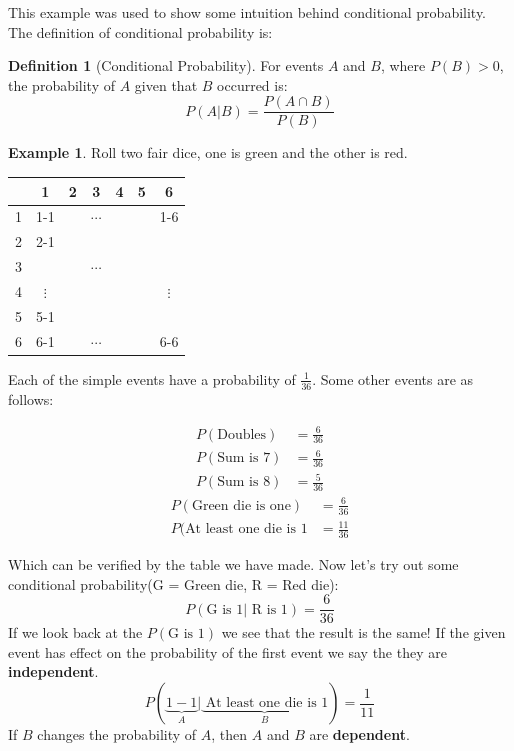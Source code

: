 \documentclass{article}
\theoremstyle{plain}
\theoremstyle{definition}
\newtheorem{defn}{Definition}[section]
\newtheorem{example}{Example}[section]
\theoremstyle{remark}
\begin{document}
This example was used to show some intuition behind conditional probability. The definition of conditional probability is:
\begin{defn}[Conditional Probability]
For events $A$ and $B$, where $P(B) > 0$, the probability of $A$ given that $B$ occurred is:
$$
P(A|B) = \frac{P(A \cap B)}{P(B)}
$$
\end{defn}

\begin{example}
  Roll two fair dice, one is green and the other is red.\\
  \begin{center}
    \begin{tabular}{r|c c c c c c}
      & 1 & 2 & 3 & 4 & 5 & 6\\  
      \hline
      1 & 1-1 & & $\cdots$ & & & 1-6\\
      2 & 2-1 & & &  & \\
      3 &  & & $\cdots$& & \\
      4 & $\vdots$ & & & & & $\vdots$ \\
      5 & 5-1 & & & & & \\
      6 & 6-1 & & $\cdots$ & & & 6-6
    \end{tabular}
  \end{center}
Each of the simple events have a probability of $\frac{1}{36}$. Some other events are as follows:
\begin{multicols}{2}
  \begin{align*}
    P(\text{Doubles}) &= \frac{6}{36}\\
    P(\text{Sum is 7}) &= \frac{6}{36}\\
    P(\text{Sum is 8}) &= \frac{5}{36}
  \end{align*}
  \vfill
  \columnbreak
  \begin{align*}
    P(\text{Green die is one}) &= \frac{6}{36}\\[7pt]
    P(\text{At least one die is 1} &= \frac{11}{36}
  \end{align*}
\end{multicols}
Which can be verified by the table we have made. Now let's try out some conditional probability(G = Green die, R = Red die):
$$
P(\text{G is 1}|\text{ R is 1}) = \frac{6}{36}
$$
If we look back at the $P(\text{G is 1})$ we see that the result is the same! If the given event has effect on the probability of the first event we say the they are \textbf{independent}.
$$
P(\underbrace{1-1}_{A}|\underbrace{\text{ At least one die is 1}}_{B}) = \frac{1}{11}
$$
If $B$ changes the probability of $A$, then $A$ and $B$ are \textbf{dependent}.
\end{example}
\end{document}
